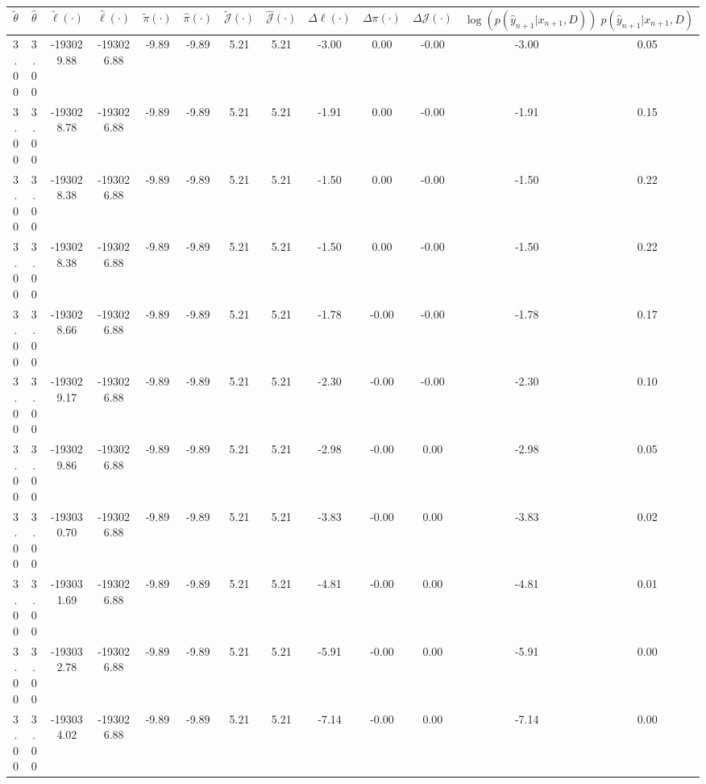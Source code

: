 \begin{table}[htbp]
        \centering
        \tiny
        \begin{adjustbox}{angle=90}
            \begin{tabular}{|c|c|c|c|c|c|c|c|c|c|c|c|c|}
                \hline
                 $\tilde{\theta}$ & $\hat{\theta}$ & $\tilde{\ell}(\cdot)$ & $\hat{\ell}(\cdot)$ & $\tilde{\pi}(\cdot)$ & $\hat{\pi}(\cdot)$ & $\tilde{\mathcal{J}}(\cdot)$ & $\hat{\mathcal{J}}(\cdot)$ & $\Delta \ell(\cdot)$ & $\Delta \pi(\cdot)$ & $\Delta \mathcal{J}(\cdot)$ & $\log(p(\hat{y}_{n+1}|x_{n+1}, D))$ & $p(\hat{y}_{n+1}|x_{n+1}, D)$ \\
                \hline
                 3.00 & 3.00 & -193029.88 & -193026.88 & -9.89 & -9.89 & 5.21 & 5.21 & -3.00 & 0.00 & -0.00 & -3.00 & 0.05\\ \hline
 3.00 & 3.00 & -193028.78 & -193026.88 & -9.89 & -9.89 & 5.21 & 5.21 & -1.91 & 0.00 & -0.00 & -1.91 & 0.15\\ \hline
 3.00 & 3.00 & -193028.38 & -193026.88 & -9.89 & -9.89 & 5.21 & 5.21 & -1.50 & 0.00 & -0.00 & -1.50 & 0.22\\ \hline
 3.00 & 3.00 & -193028.38 & -193026.88 & -9.89 & -9.89 & 5.21 & 5.21 & -1.50 & 0.00 & -0.00 & -1.50 & 0.22\\ \hline
 3.00 & 3.00 & -193028.66 & -193026.88 & -9.89 & -9.89 & 5.21 & 5.21 & -1.78 & -0.00 & -0.00 & -1.78 & 0.17\\ \hline
 3.00 & 3.00 & -193029.17 & -193026.88 & -9.89 & -9.89 & 5.21 & 5.21 & -2.30 & -0.00 & -0.00 & -2.30 & 0.10\\ \hline
 3.00 & 3.00 & -193029.86 & -193026.88 & -9.89 & -9.89 & 5.21 & 5.21 & -2.98 & -0.00 & 0.00 & -2.98 & 0.05\\ \hline
 3.00 & 3.00 & -193030.70 & -193026.88 & -9.89 & -9.89 & 5.21 & 5.21 & -3.83 & -0.00 & 0.00 & -3.83 & 0.02\\ \hline
 3.00 & 3.00 & -193031.69 & -193026.88 & -9.89 & -9.89 & 5.21 & 5.21 & -4.81 & -0.00 & 0.00 & -4.81 & 0.01\\ \hline
 3.00 & 3.00 & -193032.78 & -193026.88 & -9.89 & -9.89 & 5.21 & 5.21 & -5.91 & -0.00 & 0.00 & -5.91 & 0.00\\ \hline
 3.00 & 3.00 & -193034.02 & -193026.88 & -9.89 & -9.89 & 5.21 & 5.21 & -7.14 & -0.00 & 0.00 & -7.14 & 0.00\\ \hline
            \end{tabular}
        \end{adjustbox}
        \caption{}
        \label{}
    \end{table}
    